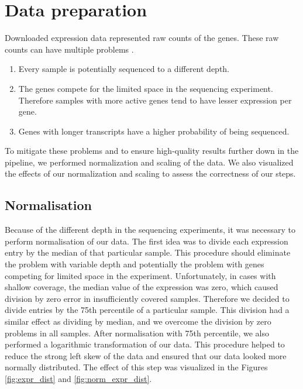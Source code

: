 \newpage
\section{Data preparation}
Downloaded expression data represented raw counts of the genes.
These raw counts can have multiple problems \cite{robinson2010scaling}.
\begin{enumerate}
    \item Every sample is potentially sequenced to a different depth.
    \item The genes compete for the limited space in the sequencing experiment. Therefore samples with more active genes tend to have lesser expression per gene. 
    \item Genes with longer transcripts have a higher probability of being sequenced.
\end{enumerate}
To mitigate these problems and to ensure high-quality results further down in the pipeline, we performed normalization and scaling of the data.
We also visualized the effects of our normalization and scaling to assess the correctness of our steps.

\subsection{Normalisation}
Because of the different depth in the sequencing experiments, it was necessary to perform normalisation of our data.
The first idea was to divide each expression entry by the median of that particular sample.
This procedure should eliminate the problem with variable depth and potentially the problem with genes competing for limited space in the experiment.  
Unfortunately, in cases with shallow coverage, the median value of the expression was zero, which caused division by zero error in insufficiently covered samples.
Therefore we decided to divide entries by the 75th percentile of a particular sample.
This division had a similar effect as dividing by median, and we overcome the division by zero problems in all samples.
After normalisation with 75th percentile, we also performed a logarithmic transformation of our data.
This procedure helped to reduce the strong left skew of the data and ensured that our data looked more normally distributed.
The effect of this step was visualized in the Figures \ref{fig:expr_dist} and \ref{fig:norm_expr_dist}.

